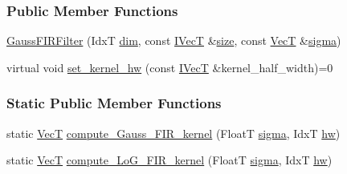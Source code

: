 \subsubsection*{Public Member Functions}
\begin{DoxyCompactItemize}
\item 
\hyperlink{classboxxer_1_1GaussFIRFilter_a4c1a2a3cd8578b90ccea9efc6f3a3c97}{Gauss\+F\+I\+R\+Filter} (IdxT \hyperlink{classboxxer_1_1GaussFIRFilter_ac7adcd4d8f8efee00a65262f596c8eda}{dim}, const \hyperlink{classboxxer_1_1GaussFIRFilter_a0083c8c9ab6032dd458b4dc93852c2b8}{I\+VecT} \&\hyperlink{classboxxer_1_1GaussFIRFilter_ac0d4e19bb2be3e8913e77283e7e4317e}{size}, const \hyperlink{classboxxer_1_1GaussFIRFilter_aafe2049df690ad8c3617c39810e78bbe}{VecT} \&\hyperlink{classboxxer_1_1GaussFIRFilter_a66ced06c688fd544d5f1f8be39aa2125}{sigma})
\item 
virtual void \hyperlink{classboxxer_1_1GaussFIRFilter_a7ada113680b67f052d11afe346ddf8bc}{set\+\_\+kernel\+\_\+hw} (const \hyperlink{classboxxer_1_1GaussFIRFilter_a0083c8c9ab6032dd458b4dc93852c2b8}{I\+VecT} \&kernel\+\_\+half\+\_\+width)=0
\end{DoxyCompactItemize}
\subsubsection*{Static Public Member Functions}
\begin{DoxyCompactItemize}
\item 
static \hyperlink{classboxxer_1_1GaussFIRFilter_aafe2049df690ad8c3617c39810e78bbe}{VecT} \hyperlink{classboxxer_1_1GaussFIRFilter_a5dd6de5fe82092ec30141ab920d75dfd}{compute\+\_\+\+Gauss\+\_\+\+F\+I\+R\+\_\+kernel} (FloatT \hyperlink{classboxxer_1_1GaussFIRFilter_a66ced06c688fd544d5f1f8be39aa2125}{sigma}, IdxT \hyperlink{classboxxer_1_1GaussFIRFilter_ae17a4e137303e452a9223ba34825e0da}{hw})
\item 
static \hyperlink{classboxxer_1_1GaussFIRFilter_aafe2049df690ad8c3617c39810e78bbe}{VecT} \hyperlink{classboxxer_1_1GaussFIRFilter_ad6a618b47db57b570278cc57b05d8c03}{compute\+\_\+\+Lo\+G\+\_\+\+F\+I\+R\+\_\+kernel} (FloatT \hyperlink{classboxxer_1_1GaussFIRFilter_a66ced06c688fd544d5f1f8be39aa2125}{sigma}, IdxT \hyperlink{classboxxer_1_1GaussFIRFilter_ae17a4e137303e452a9223ba34825e0da}{hw})
\end{DoxyCompactItemize}
